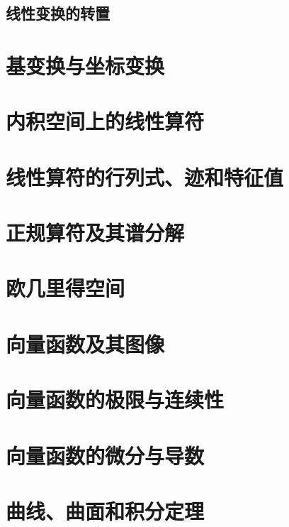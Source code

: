 \documentclass[zihao=-4,linespread=1.5,heading=true,a4paper,twoside]{ctexart}
\begin{document}
\subsection{线性变换的转置}\label{sec:II.4.3}


\section{基变换与坐标变换}\label{sec:II.5}


\section{内积空间上的线性算符}\label{sec:II.6}


\section{线性算符的行列式、迹和特征值}\label{sec:II.7}


\section{正规算符及其谱分解}\label{sec:II.8}


\section{欧几里得空间}


\section{向量函数及其图像}


\section{向量函数的极限与连续性}


\section{向量函数的微分与导数}


\section{曲线、曲面和积分定理}

\end{document}
